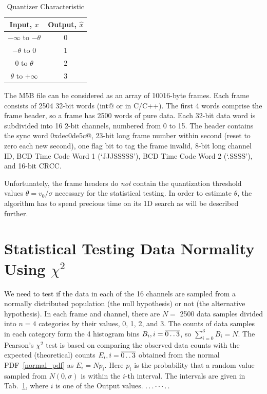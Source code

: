 \documentclass[letterpaper,twoside,12pt]{article}
\newcommand{\twodots}{\mathinner {\ldotp \ldotp}}
\begin{document}
\begin{table}[ht!]
  \begin{center}
    \caption{Quantizer Characteristic}
    \label{quant_io}
    \begin{tabular}{c|c}
      \textbf{Input, $x$} & \textbf{Output, $\hat{x}$} \\
      \hline
      $-\infty$ to $-\theta$ & 0 \\
      $-\theta$ to 0         & 1 \\
      0 to $\theta$          & 2 \\
      $\theta$ to $+\infty$  & 3 \\
    \end{tabular}
  \end{center}
\end{table}


The M5B file can be considered as an array of 10016-byte frames. Each frame consists of 2504 32-bit words (\verb@unsigned int@ or  \verb@uint@ in C/C++). The first 4 words comprise the frame header, so a frame has 2500 words of pure data. Each 32-bit data word is subdivided into 16 2-bit channels, numbered from 0 to 15. The header contains the sync word \verb@0xdec0de5c@, 23-bit long frame number within second (reset to zero each new second), one flag bit to tag the frame invalid, 8-bit long channel ID, BCD Time Code Word 1 (‘JJJSSSSS’), BCD Time Code Word 2 (‘.SSSS’), and  16-bit CRCC.

Unfortunately, the frame headers do \emph{not} contain the quantization threshold values $\theta = v_0/\sigma$ necessary for the statistical testing. In order to estimate $\theta$, the algorithm has to spend precious time on its 1D search as will be described further. 




\section{Statistical Testing Data Normality Using $\chi^2$}

We need to test if the data in each of the 16 channels are sampled from a normally distributed population (the null hypothesis) or not (the alternative hypothesis). In each frame and channel, there are $N=$ 2500 data samples divided into $n=4$ categories by their values, 0, 1, 2, and 3. The counts of data samples in each category form the 4 histogram bins $B_i, i=\overline{0 \twodots 3}$, so $\sum_{i=0}^3 B_i = N$. The Pearson's $\chi^2$ test is based on comparing the observed data counts with the expected (theoretical) counts $E_i, i=\overline{0 \twodots 3}$ obtained from the normal PDF~\eqref{normal_pdf} as $E_i = Np_i$. Here $p_i$ is the probability that a random value sampled from $N(0,\sigma)$ is within the $i$-th interval. The intervals are given in Tab.~\ref{quant_io}, where $i$ is one of the Output values. $\ldots\cdots\ldotp\ldotp$
\end{document}
